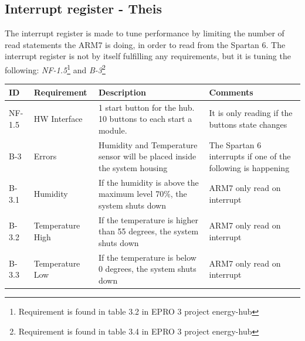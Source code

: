 %
%
%
%
%
%
%
%

\subsection{Interrupt register - Theis}
The interrupt register is made to tune performance by limiting the number of read statements the ARM7 is doing, in order to read from the Spartan 6. The interrupt register is not by itself fulfilling any requirements, but it is tuning the following: \textit{NF-1.5}\footnote{Requirement is found in table 3.2 in EPRO 3 project energy-hub} and \textit{B-3}\footnote{Requirement is found in table 3.4 in EPRO 3 project energy-hub}
\begin{table}[H]
\centering
	\begin{tabular}{|p{1.2cm}|p{2.3cm}|p{6cm}|p{6cm}|}
	\hline
	ID		& Requirement		& Description																& Comments\\\hline
	NF-1.5	& HW Interface		& 1 start button for the hub. 10 buttons to each start a module.			& It is only reading if the buttons state changes\\\hline
	B-3		& Errors			& Humidity and Temperature sensor will be placed inside the system housing	& The Spartan 6 interrupts if one of the following is happening\\\hline
	B-3.1	& Humidity			& If the humidity is above the maximum level 70\%, the system shuts down	& ARM7 only read on interrupt\\\hline
	B-3.2	& Temperature High	& If the temperature is higher than 55 degrees, the system shuts down		& ARM7 only read on interrupt\\\hline
	B-3.3	& Temperature Low	& If the temperature is below 0 degrees, the system shuts down				& ARM7 only read on interrupt\\\hline
	\end{tabular}
\end{table}
